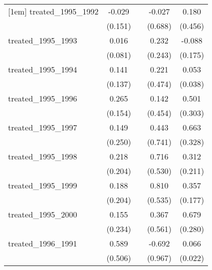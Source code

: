 {\begin{tabular}{l*{4}{c}}
[1em]
treated\_1995\_1992&      -0.029         &                     &      -0.027         &       0.180         \\
            &     (0.151)         &                     &     (0.688)         &     (0.456)         \\
[1em]
treated\_1995\_1993&       0.016         &                     &       0.232         &      -0.088         \\
            &     (0.081)         &                     &     (0.243)         &     (0.175)         \\
[1em]
treated\_1995\_1994&       0.141         &                     &       0.221         &       0.053         \\
            &     (0.137)         &                     &     (0.474)         &     (0.038)         \\
[1em]
treated\_1995\_1996&       0.265         &                     &       0.142         &       0.501         \\
            &     (0.154)         &                     &     (0.454)         &     (0.303)         \\
[1em]
treated\_1995\_1997&       0.149         &                     &       0.443         &       0.663\sym{*}  \\
            &     (0.250)         &                     &     (0.741)         &     (0.328)         \\
[1em]
treated\_1995\_1998&       0.218         &                     &       0.716         &       0.312         \\
            &     (0.204)         &                     &     (0.530)         &     (0.211)         \\
[1em]
treated\_1995\_1999&       0.188         &                     &       0.810         &       0.357\sym{*}  \\
            &     (0.204)         &                     &     (0.535)         &     (0.177)         \\
[1em]
treated\_1995\_2000&       0.155         &                     &       0.367         &       0.679\sym{*}  \\
            &     (0.234)         &                     &     (0.561)         &     (0.280)         \\
[1em]
treated\_1996\_1991&       0.589         &                     &      -0.692         &       0.066\sym{**} \\
            &     (0.506)         &                     &     (0.967)         &     (0.022)         \\

\end{tabular}}
